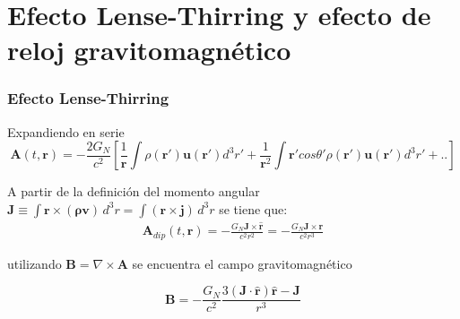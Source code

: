 \documentclass[aspectratio=169,10pt,usenames,dvipsnames,spanish]{beamer}
\begin{document}
\section{Efecto Lense-Thirring y efecto de reloj gravitomagnético}
\begin{frame}
\frametitle{Efecto Lense-Thirring}
Expandiendo en serie 
\begin{equation}\label{Aexpandida}
    \mathbf{A}(t,\mathbf{r})=-\frac{2G_N}{c^2}\left[\frac{1}{\mathbf{r}}\int \rho(\mathbf{r'})\mathbf{u}(\mathbf{r'})d^3r'+\frac{1}{\mathbf{r}^2}\int \mathbf{r'}cos\theta'\rho(\mathbf{r'})\mathbf{u}(\mathbf{r'})d^3r'+..\right]
\end{equation}

A partir de la definición del momento angular $\mathbf{J}\equiv\int \mathbf{r \times(\rho \mathbf{v})} \,d^3r=\int (\mathbf{r \times\mathbf{j}})\, d^3r$ \cite{Ciufolini1995} se tiene que:
\begin{align} \label{Aecu:Adipolar3}
    \mathbf{A}_{dip}(t,\mathbf{r})=-\frac{G_N\mathbf{J}\times\hat{\mathbf{r}}}{c^2r^2}=-\frac{G_N\mathbf{J}\times\mathbf{r}}{c^2r^3}
\end{align}

utilizando $ \mathbf{B}=\nabla\times\mathbf{A}$ se encuentra el campo gravitomagnético

\begin{equation}\label{Bdipolo}
    \mathbf{B}=-\frac{G_N}{c^2}\frac{3(\mathbf{J}\cdot\hat{\mathbf{r}})\hat{\mathbf{r}}-\mathbf{J}}{r^3}
\end{equation}
\end{frame}

\end{document}
